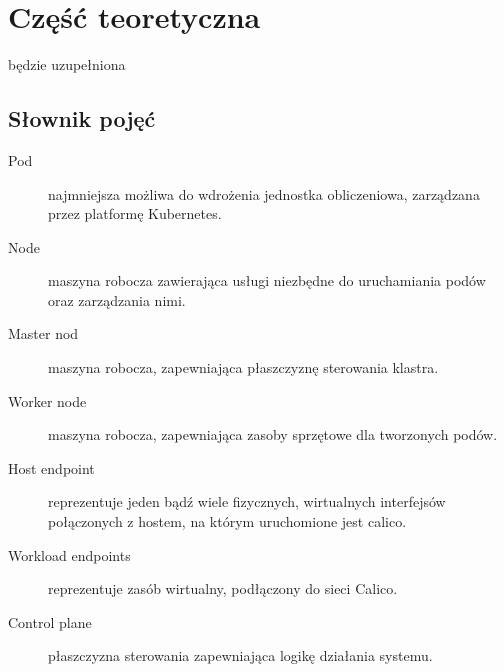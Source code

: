 \documentclass[pl,final,oneside]{mgr} %
\begin{document}
\chapter{Część teoretyczna}
będzie uzupełniona
\section{Słownik pojęć}
\begin{description}
\item[Pod] najmniejsza możliwa do wdrożenia jednostka obliczeniowa, zarządzana przez platformę Kubernetes.
\item[Node] maszyna robocza zawierająca usługi niezbędne do uruchamiania podów oraz zarządzania nimi.
\item[Master nod] maszyna robocza, zapewniająca płaszczyznę sterowania klastra.
\item[Worker node] maszyna robocza, zapewniająca zasoby sprzętowe dla tworzonych podów.
\item[Host endpoint] reprezentuje jeden bądź wiele fizycznych, wirtualnych interfejsów połączonych z hostem, na którym uruchomione jest calico.
\item[Workload endpoints] reprezentuje zasób wirtualny, podłączony do sieci Calico.
\item[Control plane] płaszczyzna sterowania zapewniająca logikę działania systemu.
\end{description}
\end{document}
